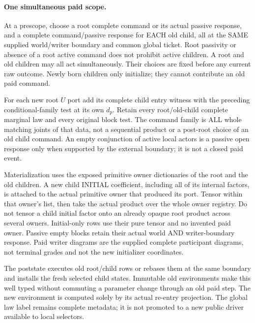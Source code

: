 \documentclass[11pt]{article}
\begin{document}
\paragraph{One simultaneous paid scope.}
At a prescope, choose a root complete command or its actual passive response, and a complete command/passive response for EACH old child, all at the SAME supplied world/writer boundary and common global ticket. Root passivity or absence of a root active command does not prohibit active children. A root and old children may all act simultaneously. Their choices are fixed before any current raw outcome. Newly born children only initialize; they cannot contribute an old paid command.

For each new root $U$ port add its complete child entry witness with the preceding conditional-family test at its own $d_p$. Retain every root/old-child complete marginal law and every original block test. The command family is ALL whole matching joints of that data, not a sequential product or a post-root choice of an old child command. An empty conjunction of active local actors is a passive open response only when supported by the external boundary; it is not a closed paid event.

Materialization uses the exposed primitive owner dictionaries of the root and the old children. A new child INITIAL coefficient, including all of its internal factors, is attached to the actual primitive owner that produced its port. Tensor within that owner's list, then take the actual product over the whole owner registry. Do not tensor a child initial factor onto an already opaque root product across several owners. Initial-only rows use their pure tensor and no invented paid owner. Passive empty blocks retain their actual world AND writer-boundary response. Paid writer diagrams are the supplied complete participant diagrams, not terminal grades and not the new initializer coordinates.

The poststate executes old root/child rows or rebases them at the same boundary and installs the fresh selected child states. Immutable old environments make this well typed without commuting a parameter change through an old paid step. The new environment is computed solely by its actual re-entry projection. The global law label remains complete metadata; it is not promoted to a new public driver available to local selectors.
\end{document}

